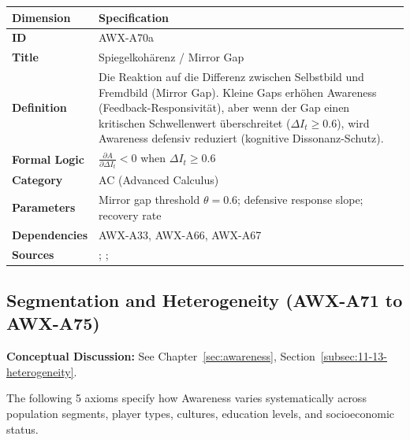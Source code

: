 \begin{table}[htbp]
\small
\begin{tabular}{p{3cm}p{11cm}}
\toprule
\textbf{Dimension} & \textbf{Specification} \\
\midrule
\textbf{ID} & AWX-A70a \\
\textbf{Title} & Spiegelkohärenz / Mirror Gap \\
\textbf{Definition} & Die Reaktion auf die Differenz zwischen Selbstbild und Fremdbild (Mirror Gap). Kleine Gaps erhöhen Awareness (Feedback-Responsivität), aber wenn der Gap einen kritischen Schwellenwert überschreitet ($\Delta I_t \geq 0.6$), wird Awareness defensiv reduziert (kognitive Dissonanz-Schutz). \\
\textbf{Formal Logic} & $\frac{\partial A}{\partial \Delta I_t} < 0$ when $\Delta I_t \geq 0.6$ \\
\textbf{Category} & AC (Advanced Calculus) \\
\textbf{Parameters} & Mirror gap threshold $\theta = 0.6$; defensive response slope; recovery rate \\
\textbf{Dependencies} & AWX-A33, AWX-A66, AWX-A67 \\
\textbf{Sources} & \citet{festinger1957cognitive}; \citet{swann1987identity}; \citet{sedikides1993assessment} \\
\bottomrule
\end{tabular}
\end{table}




\subsection{Segmentation and Heterogeneity (AWX-A71 to AWX-A75)}

\begin{cross-reference}
\textbf{Conceptual Discussion:} See Chapter~\ref{sec:awareness}, Section~\ref{subsec:11-13-heterogeneity}.
\end{cross-reference}
The following 5 axioms specify how Awareness varies systematically across population segments, player types, cultures, education levels, and socioeconomic status.

